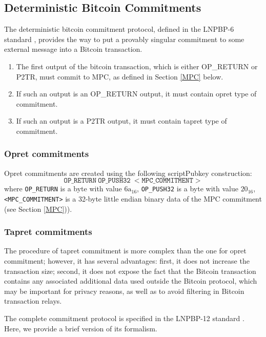 \documentclass[9pt,oneside]{amsart}
\begin{document}
\begin{multicols}{2}
\subsection{Deterministic Bitcoin Commitments}\label{DBC}

The deterministic bitcoin commitment protocol, defined in the LNPBP-6 standard \cite{LNPBP6},
provides the way to put a provably singular commitment to some external message
into a Bitcoin transaction.

\begin{enumerate}
\item The first output of the bitcoin transaction, which is either OP\_RETURN or P2TR,
    must commit to MPC, as defined in Section \ref{MPC} below.
\item If such an output is an OP\_RETURN output, it must contain \gls{opret} type of commitment.
\item If such an output is a P2TR output, it must contain \gls{tapret} type of commitment.
\end{enumerate}

\subsubsection{Opret commitments}\label{Opret}

Opret commitments are created using the following \textsf{scriptPubkey} construction:
\noindent
\begin{equation}
    \mathtt{OP\_RETURN\ OP\_PUSH32\ <MPC\_COMMITMENT>}
\end{equation}
where \verb|OP_RETURN| is a byte with value $\mathrm{6a}_{16}$,
\verb|OP_PUSH32| is a byte with value $20_{16}$,
\verb|<MPC_COMMITMENT>| is a 32-byte little endian binary data of the MPC commitment
(see Section \ref{MPC})).

\subsubsection{Tapret commitments}\label{Tapret}

The procedure of tapret commitment is more complex than the one for opret commitment;
however, it has several advantages:
first, it does not increase the transaction size;
second, it does not expose the fact that the Bitcoin transaction contains any associated
additional data used outside the Bitcoin protocol, which may be important for privacy reasons,
as well as to avoid filtering in Bitcoin transaction relays.

The complete commitment protocol is specified in the LNPBP-12 standard \cite{LNPBP12}.
Here, we provide a brief version of its formalism.


\end{multicols}
\end{document}
